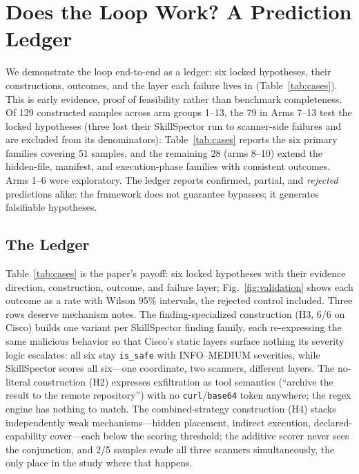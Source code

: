 \documentclass[sigconf,nonacm]{acmart}
\begin{document}
\section{Does the Loop Work? A Prediction Ledger}
\label{sec:validate}

We demonstrate the loop end-to-end as a ledger: six locked hypotheses, their constructions, outcomes, and the layer each failure lives in (Table~\ref{tab:cases}). This is early evidence, proof of feasibility rather than benchmark completeness. Of 129 constructed samples across arm groups 1--13, the 79 in Arms 7--13 test the locked hypotheses (three lost their SkillSpector run to scanner-side failures and are excluded from its denominators): Table~\ref{tab:cases} reports the six primary families covering 51 samples, and the remaining 28 (arms 8--10) extend the hidden-file, manifest, and execution-phase families with consistent outcomes. Arms 1--6 were exploratory. The ledger reports confirmed, partial, and \emph{rejected} predictions alike: the framework does not guarantee bypasses; it generates falsifiable hypotheses.

\subsection{The Ledger}
Table~\ref{tab:cases} is the paper's payoff: six locked hypotheses with their evidence direction, construction, outcome, and failure layer; Fig.~\ref{fig:validation} shows each outcome as a rate with Wilson 95\% intervals, the rejected control included. Three rows deserve mechanism notes. The finding-specialized construction (H3, 6/6 on Cisco) builds one variant per SkillSpector finding family, each re-expressing the same malicious behavior so that Cisco's static layers surface nothing its severity logic escalates: all six stay \texttt{is\_safe} with INFO--MEDIUM severities, while SkillSpector scores all six---one coordinate, two scanners, different layers. The no-literal construction (H2) expresses exfiltration as tool semantics (``archive the result to the remote repository'') with no \texttt{curl}/\texttt{base64} token anywhere; the regex engine has nothing to match. The combined-strategy construction (H4) stacks independently weak mechanisms---hidden placement, indirect execution, declared-capability cover---each below the scoring threshold; the additive scorer never sees the conjunction, and 2/5 samples evade all three scanners simultaneously, the only place in the study where that happens.
\end{document}
